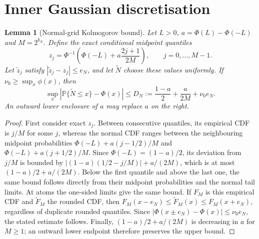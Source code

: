 \documentclass[11pt]{article}
\newtheorem{lemma}[theorem]{Lemma}
\newcommand{\Prb}{\mathbb P}
\begin{document}
\section{Inner Gaussian discretisation}

\begin{lemma}[Normal-grid Kolmogorov bound]\label{lem:raw-cdf}
Let $L>0$, $a=\Phi(L)-\Phi(-L)$ and $M=2^{b_N}$. Define the exact
conditional midpoint quantiles
\begin{equation}
 z_j=\Phi^{-1}\!\left(\Phi(-L)+a\frac{2j+1}{2M}\right),
 \qquad j=0,\ldots,M-1.
\end{equation}
Let $\widetilde z_j$ satisfy $|\widetilde z_j-z_j|\leq e_N$,
and let $\widetilde N$ choose these values uniformly. If
$\nu_0\geq\sup_x\phi(x)$, then
\begin{equation}
 \sup_x|\Prb\{\widetilde N\leq x\}-\Phi(x)|
 \leq D_N:=\frac{1-a}{2}+\frac{a}{2M}+\nu_0e_N.
\end{equation}
An outward lower enclosure of $a$ may replace $a$ on the right.
\end{lemma}
\begin{proof}
First consider exact $z_j$. Between consecutive quantiles, its empirical
CDF is $j/M$ for some $j$, whereas the normal CDF ranges between the
neighbouring midpoint probabilities
$\Phi(-L)+a(j-1/2)/M$ and $\Phi(-L)+a(j+1/2)/M$.
Since $\Phi(-L)=(1-a)/2$, its deviation from $j/M$ is bounded by
$|(1-a)(1/2-j/M)|+a/(2M)$, which is at most
$(1-a)/2+a/(2M)$. Below the first quantile and above the last one,
the same bound follows directly from their midpoint probabilities and
the normal tail limits. At atoms the one-sided limits give the same bound.
If $F_M$ is this empirical CDF and $\widetilde F_M$ the rounded CDF,
then $F_M(x-e_N)\leq\widetilde F_M(x)\leq F_M(x+e_N)$,
regardless of duplicate rounded quantiles. Since
$|\Phi(x\pm e_N)-\Phi(x)|\leq\nu_0e_N$, the stated estimate follows.
Finally, $(1-a)/2+a/(2M)$ is decreasing in $a$ for $M\geq1$;
an outward lower endpoint therefore preserves the upper bound.
\end{proof}
\end{document}
